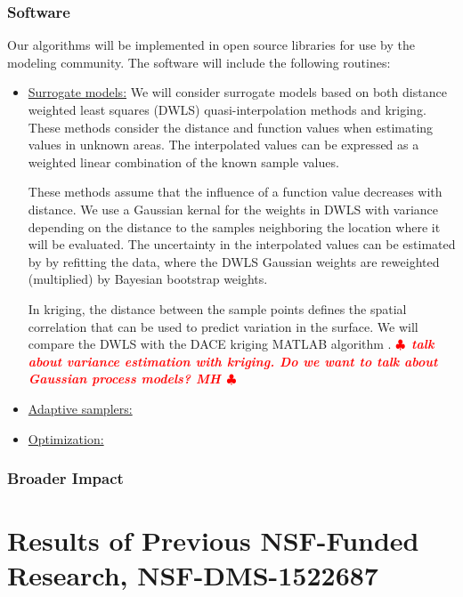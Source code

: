 \documentclass[11pt]{NSFamsart}
\newif\ifnotesw \noteswtrue
\newcommand{\notes}[1]{\ifnotesw \textcolor{red}{  $\clubsuit$\ {\sf \bf \it  #1}\ $\clubsuit$  }\fi}
\begin{document}
\subsubsection{Software}
Our algorithms will be implemented in open source libraries for use by the modeling community.  The software will include the following routines:
\begin{itemize}
\item \underline{Surrogate models:} We will consider surrogate models based on both distance weighted least squares (DWLS) quasi-interpolation methods and kriging.  
These methods consider the distance and function values when estimating values in unknown areas. The interpolated values can be expressed as a weighted linear combination of the known sample values. 

These methods assume that the influence of a function value decreases with distance.  We use a Gaussian kernal for the weights in DWLS with variance depending on the distance to the samples neighboring the location where it will be evaluated.
The uncertainty in the interpolated values can be estimated by  by refitting the data, where the DWLS Gaussian weights are reweighted (multiplied) by Bayesian bootstrap weights.  

In kriging,  the distance between the sample points defines the spatial correlation that can be used to predict variation in the surface. We will compare the DWLS with the DACE kriging MATLAB algorithm \cite{}. \notes{talk about variance estimation with kriging.  Do we want to talk about Gaussian process models? MH}

\item \underline{Adaptive samplers:}

\item \underline{Optimization:}

\end{itemize}

\subsubsection{Broader Impact}



\section{Results of Previous NSF-Funded Research,
NSF-DMS-1522687} \label{sec:Previous}
\end{document}
